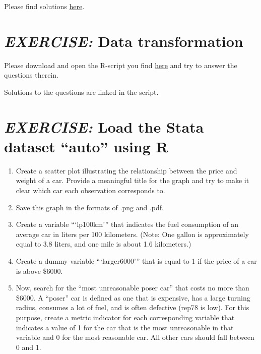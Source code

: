 \documentclass[
  12pt,
  oneside]{book}
\begin{document}
Please find solutions \href{https://raw.githubusercontent.com/hubchev/courses/main/scr/exe_subset.R}{here}.

\hypertarget{exercise-data-transformation}{%
\section*{\texorpdfstring{\emph{EXERCISE:} Data transformation}{EXERCISE: Data transformation}}\label{exercise-data-transformation}}

Please download and open the R-script you find \href{https://raw.githubusercontent.com/hubchev/courses/main/scr/data_transformation.R}{here} and try to answer the questions therein.

Solutions to the questions are linked in the script.

\hypertarget{exercise-load-the-stata-dataset-auto-using-r}{%
\section*{\texorpdfstring{\emph{EXERCISE:} Load the Stata dataset ``auto'' using R}{EXERCISE: Load the Stata dataset ``auto'' using R}}\label{exercise-load-the-stata-dataset-auto-using-r}}

\begin{enumerate}
\def\labelenumi{\arabic{enumi}.}
\item
  Create a scatter plot illustrating the relationship between the price and weight of a car. Provide a meaningful title for the graph and try to make it clear which car each observation corresponds to.
\item
  Save this graph in the formats of .png and .pdf.
\item
  Create a variable ```lp100km''' that indicates the fuel consumption of an average car in liters per 100 kilometers. (Note: One gallon is approximately equal to 3.8 liters, and one mile is about 1.6 kilometers.)
\item
  Create a dummy variable ```larger6000''' that is equal to 1 if the price of a car is above \$6000.
\item
  Now, search for the ``most unreasonable poser car'' that costs no more than \$6000. A ``poser'' car is defined as one that is expensive, has a large turning radius, consumes a lot of fuel, and is often defective (rep78 is low). For this purpose, create a metric indicator for each corresponding variable that indicates a value of 1 for the car that is the most unreasonable in that variable and 0 for the most reasonable car. All other cars should fall between 0 and 1.
\end{enumerate}
\end{document}
